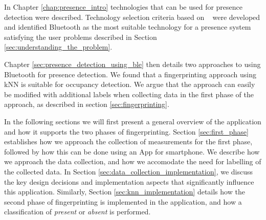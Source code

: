 In Chapter \ref{chap:presence_intro} technologies that can be used for presence detection were described. 
Technology selection criteria based on \citeauthor{presence_ble_review}~\cite{presence_ble_review} were developed and identified Bluetooth as the most suitable technology for a presence system satisfying the user problems described in Section \ref{sec:understanding_the_problem}.

Chapter \ref{sec:presence_detection_using_ble} then details two approaches to using Bluetooth for presence detection. 
We found that a fingerprinting approach using kNN is suitable for occupancy detection. 
We argue that the approach can easily be modified with additional labels when collecting data in the first phase of the approach, as described in section \ref{sec:fingerprinting}.

In the following sections we will first present a general overview of the application and how it supports the two phases of fingerprinting. 
Section \ref{sec:first_phase} establishes how we approach the collection of measurements for the first phase, followed by how this can be done using an App for smartphone. 
We describe how we approach the data collection, and how we accomodate the need for labelling of the collected data.
In Section \ref{sec:data_collection_implementation}, we discuss the key design decisions and implementation aspects that significantly influence this application.
Similarly, Section \ref{sec:knn_implementation} details how the second phase of fingerprinting is implemented in the application, and how a classification of \textit{present} or \textit{absent} is performed.



